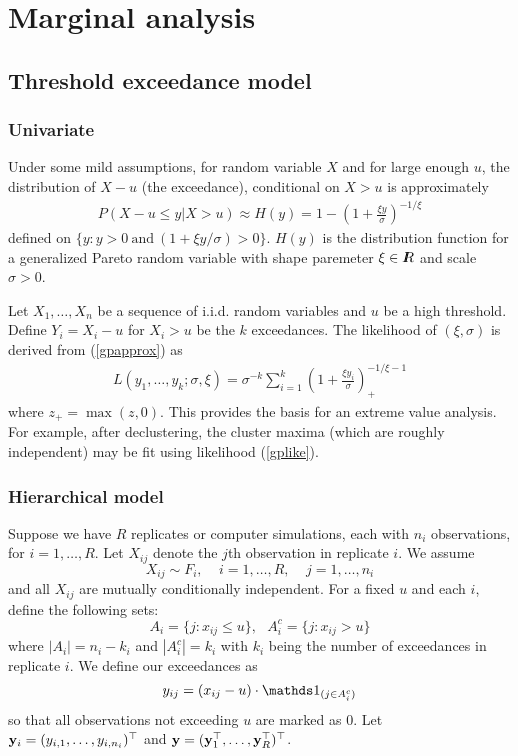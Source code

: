 \section{Marginal analysis}

\subsection{Threshold exceedance model}
\label{thresh}

\subsubsection{Univariate}
\label{univariate}

Under some mild assumptions, for random variable $X$ and for large enough $u$, the distribution of $X-u$ (the exceedance), conditional on $X>u$ is approximately
\begin{align}
P(X-u\leq y|X>u) \approx H(y) = 1 - \left(1+\frac{\xi y}{\sigma}\right)^{-1/\xi} \label{gpapprox}
\end{align}
defined on $\{y:y>0~\mathrm{and}~(1+\xi y/\sigma) >0\}$. $H(y)$ is the distribution function for a generalized Pareto random variable with shape paremeter $\xi\in I\hspace{-4.4pt}R$ and scale $\sigma>0$.

Let $X_1,\ldots,X_n$ be a sequence of i.i.d. random variables and $u$ be a high threshold. Define $Y_i=X_i-u$ for $X_i>u$ be the $k$ exceedances. The likelihood of $(\xi,\sigma)$ is derived from (\ref{gpapprox}) as
\begin{align}
L(y_1,\ldots,y_k;\sigma,\xi)=\sigma^{-k}\sum_{i=1}^k\left(1+\frac{\xi y_i}{\sigma}\right)_+^{-1/\xi-1} \label{gplike}
\end{align}
where $z_+=\max(z,0)$. This provides the basis for an extreme value analysis. For example, after declustering, the cluster maxima (which are roughly independent) may be fit using likelihood (\ref{gplike}).

\subsubsection{Hierarchical model}
\label{hier}

Suppose we have $R$ replicates or computer simulations, each with $n_i$ observations, for $i=1,\ldots,R$. Let $X_{ij}$ denote the $j$th observation in replicate $i$. We assume
\[ X_{ij} \sim F_i,~~~~~i=1,\ldots,R,~~~~~j=1,\ldots,n_i \]
and all $X_{ij}$ are mutually conditionally independent. For a fixed $u$ and each $i$, define the following sets:
\[ A_i = \{j:x_{ij}\leq u\},~~~ A_i^c = \{j: x_{ij}>u\} \]
where $|A_i|=n_i-k_i$ and $|A_i^c|=k_i$ with $k_i$ being the number of exceedances in replicate $i$. We define our exceedances as
\[ y_{ij} = (x_{ij}-u)\cdot \ind_{(j \in A_i^c)} \]
so that all observations not exceeding $u$ are marked as $0$. Let $\mathbf{\bm{y}}_i=(y_{i,1},\ldots,y_{i,n_i})^\top$ and $\mathbf{\bm{y}}=(\mathbf{\bm{y}}_1^\top,\ldots,\mathbf{\bm{y}}_R^\top)^\top$.

